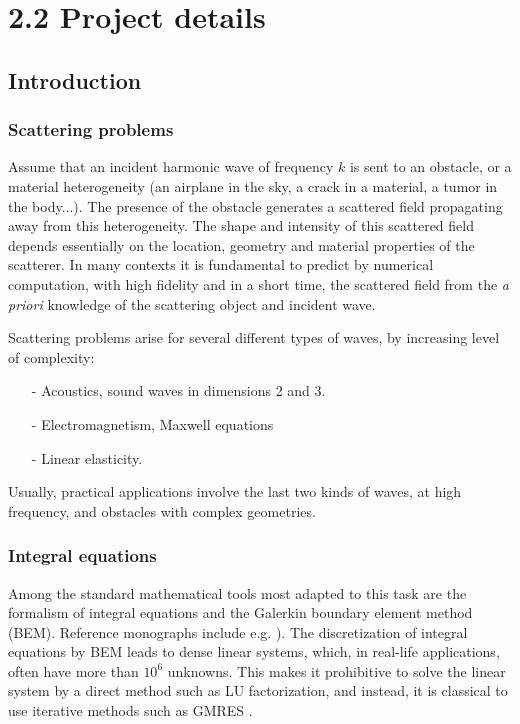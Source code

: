\documentclass[]{article}
\begin{document}
\section*{2.2 Project details}

\subsection*{Introduction}


\subsubsection*{Scattering problems}	

Assume that an incident harmonic wave of frequency $k$ is sent to an obstacle, or a material heterogeneity (an airplane in the sky, a crack in a material, a tumor in the body...). The presence of the obstacle generates a scattered field propagating away from this heterogeneity. The shape and intensity of this scattered field depends essentially on the location, geometry and material properties of the scatterer. In many contexts it is fundamental to predict by numerical computation, with high fidelity and in a short time, the scattered field from the \textit{a priori} knowledge of the scattering object and incident wave. 

Scattering problems arise for several different types of waves, by increasing level of complexity:
\begin{itemize}\itemsep-.2em 
	\item[-] Acoustics, sound waves in dimensions 2 and 3.
	\item[-] Electromagnetism, Maxwell equations
	\item[-] Linear elasticity. 
\end{itemize} 
Usually, practical applications involve the last two kinds of waves, at high frequency, and obstacles with complex geometries.  

\subsubsection*{Integral equations}

Among the standard mathematical tools most adapted to this task are the formalism of integral equations and the Galerkin boundary element method (BEM). Reference monographs include e.g. \cite{mclean2000strongly,sauter2010boundary}). The discretization of integral equations by BEM leads to dense linear systems, which, in real-life applications, often have more than $10^6$ unknowns. This makes it prohibitive to solve the linear system by a direct method such as LU factorization, and instead, it is classical to use iterative methods such as GMRES \cite{saad1986gmres}.
\end{document}
